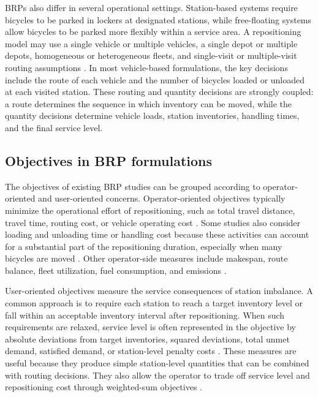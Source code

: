 BRPs also differ in several operational settings. Station-based systems require bicycles to be parked in lockers at designated stations, while free-floating systems allow bicycles to be parked more flexibly within a service area. A repositioning model may use a single vehicle or multiple vehicles, a single depot or multiple depots, homogeneous or heterogeneous fleets, and single-visit or multiple-visit routing assumptions \citep{alvarez-valdesOptimizingLevelService2016,liuStaticFreefloatingBike2018,duStaticRebalancingOptimization2020}. In most vehicle-based formulations, the key decisions include the route of each vehicle and the number of bicycles loaded or unloaded at each visited station. These routing and quantity decisions are strongly coupled: a route determines the sequence in which inventory can be moved, while the quantity decisions determine vehicle loads, station inventories, handling times, and the final service level.

\subsection{Objectives in BRP formulations}

The objectives of existing BRP studies can be grouped according to operator-oriented and user-oriented concerns. Operator-oriented objectives typically minimize the operational effort of repositioning, such as total travel distance, travel time, routing cost, or vehicle operating cost \citep{benchimolBalancingStationsSelf2011,chemlaBikeSharingSystems2013,dellamicoDestroyRepairAlgorithm2016}. Some studies also consider loading and unloading time or handling cost because these activities can account for a substantial part of the repositioning duration, especially when many bicycles are moved \citep{ravivStaticRepositioningBikesharing2013,rainer-harbachPILOTGRASPVNS2015,szetoChemicalReactionOptimization2016}. Other operator-side measures include makespan, route balance, fleet utilization, fuel consumption, and emissions \citep{alvarez-valdesOptimizingLevelService2016,schuijbroekInventoryRebalancingVehicle2017,shuiDynamicGreenBike2018,wangStaticGreenRepositioning2018,chenStaticGreenBike2023}.

User-oriented objectives measure the service consequences of station imbalance. A common approach is to require each station to reach a target inventory level or fall within an acceptable inventory interval after repositioning. When such requirements are relaxed, service level is often represented in the objective by absolute deviations from target inventories, squared deviations, total unmet demand, satisfied demand, or station-level penalty costs \citep{contardoBalancingDynamicPublic2012,digasperoConstraintBasedApproachesBalancing2013,hoSolvingStaticRepositioning2014,rainer-harbachPILOTGRASPVNS2015,brinkmannInventoryRoutingBike2016}. These measures are useful because they produce simple station-level quantities that can be combined with routing decisions. They also allow the operator to trade off service level and repositioning cost through weighted-sum objectives \citep{ravivStaticRepositioningBikesharing2013,forma3stepMathHeuristic2015,hoHybridLargeNeighborhood2017,chenStaticGreenBike2023}.

